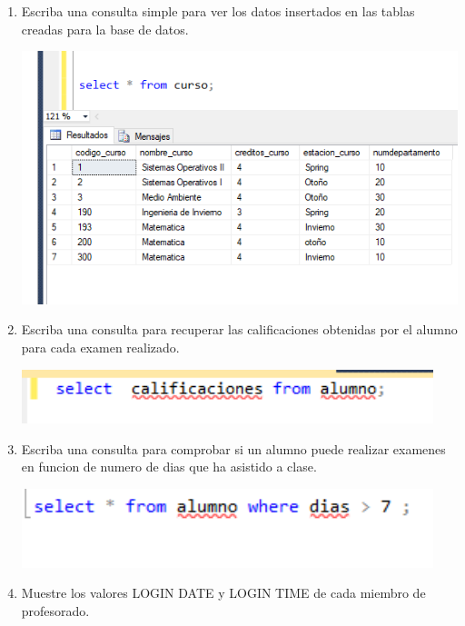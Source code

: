\documentclass[12pt,letterpaper]{article}
\begin{document}
\begin{enumerate}[1.]
    \item Escriba una consulta simple para ver los datos insertados en las tablas creadas para la base de datos.
    
\begin{center}
\includegraphics[width=15cm]{./IMAGENES/imagen6_1}
\end{center}

    
    
    \item Escriba una consulta para recuperar las calificaciones obtenidas por el alumno para cada examen realizado.
    
    
\begin{center}
\includegraphics[width=12cm]{./IMAGENES/imagen6_2}
\end{center}

    
    \item Escriba una consulta para comprobar si un alumno puede realizar examenes en funcion de numero de dias que ha asistido a clase.
    
     
\begin{center}
\includegraphics[width=12cm]{./IMAGENES/imagen6_3}
\end{center}


    \item Muestre los valores LOGIN DATE y LOGIN TIME de cada miembro de profesorado.
    

\end{enumerate}
\end{document}
